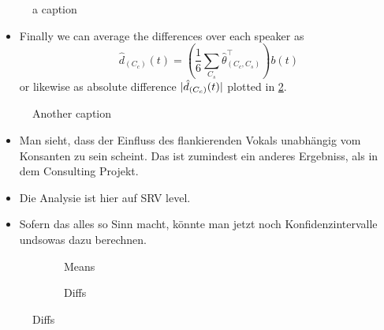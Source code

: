 \begin{figure}
  \centering
  \caption{a caption}
  \label{fig:4-diffs-vpn}
\end{figure}
\begin{itemize}
  \item Finally we can average the differences over each speaker as
    $$ \hat d_{(C_c)} (t) = \left(\frac{1}{6} \sum_{C_s} \hat \theta^\top_{(C_c, C_s)} \right) b(t)$$
    or likewise as absolute difference  $\lvert\hat d_{(C_c)}(t)\rvert$ plotted in \cref{fig:4-diffs}.
\end{itemize}
\begin{figure}
  \centering
  \caption{Another caption}
  \label{fig:4-diffs}
\end{figure}
\begin{itemize}
  \item Man sieht, dass der Einfluss des flankierenden Vokals unabhängig vom Konsanten zu sein scheint.
    Das ist zumindest ein anderes Ergebniss, als in dem Consulting Projekt.
  \item Die Analysie ist hier auf SRV level.
  \item Sofern das alles so Sinn macht, könnte man jetzt noch Konfidenzintervalle undsowas dazu berechnen.
\end{itemize}
\newpage
\begin{figure}
  \centering
  \begin{subfigure}{0.75\textwidth}
    \centering
    \caption{Means}
  \end{subfigure}
  \begin{subfigure}{0.25\textwidth}
    \centering
    \caption{Diffs}
  \end{subfigure}
  \label{fig:4-tounges}
\end{figure}

